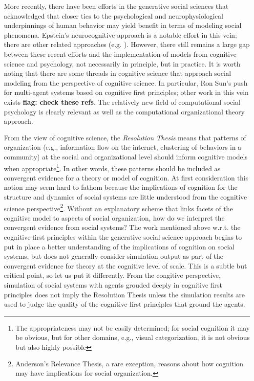 \documentclass{article}
\begin{document}
More recently, there have been efforts in the generative social sciences that acknowledged that closer ties to the psychological and neurophysiological underpinnings of human behavior may yield benefit in terms of modeling social phenomena.  Epstein's neurocognitive approach is a notable effort in this vein\cite{epstein2014}; there are other related approaches (e.g. \cite{caillou2017,sakellariou2008,malleson2012}).  However, there still remains a large gap between these recent efforts and the implementation of models from cognitive science and psychology, not necessarily in principle, but in practice. It is worth noting that there are some threads in cognitive science that approach social modeling from the perspective of cognitive science.  In particular, Ron Sun's push for multi-agent systems based on cognitive first principles\cite{sun2006}; other work in this vein exists\cite{Bhattacharyya2010,lebiere2000,lebiere2003,reitter2010,reitter2012,romero2014,gonzalez2003,fu2007,huberman1998,west2001,west2005} \textbf{flag: check these refs}.  The relatively new field of computational social psychology is clearly relevant\cite{vallacher2017} as well as the computational organizational theory approach\cite{prietula1998}.

From the view of cognitive science, the \textit{Resolution Thesis} means that patterns of organization (e.g., information flow on the internet, clustering of behaviors in a community) at the social and organizational level should inform cognitive models when appropriate\footnote{The appropriateness may not be easily determined; for social cognition it may be obvious, but for other domains, e.g., visual categorization, it is not obvious but also highly possible}.  In other words, these patterns should be included as convergent evidence for a theory or model of cognition.  At first consideration this notion may seem hard to fathom because the implications of cognition for the structure and dynamics of social systems are little understood from the cognitive science perspective\footnote{Anderson's Relevance Thesis\cite{anderson2002}, a rare exception, reasons about how cognition may have implications for social organization.}.  Without an explanatory scheme that links facets of the cognitive model to aspects of social organization, how do we interpret the convergent evidence from social systems?  The work mentioned above w.r.t. the cognitive first principles within the generative social science approach \cite{sun2006,Bhattacharyya2010,lebiere2000,lebiere2003,reitter2010,reitter2012,romero2014,gonzalez2003,fu2007,huberman1998,west2001,west2005} begins to put in  place a better understanding of the implications of cognition on social systems, but does not generally consider simulation output as part of the convergent evidence for theory at the cognitive level of scale.  This is a subtle but critical point, so let us put it differently.  From the congitive perspective, simulation of social systems with agents grouded deeply in cognitive first principles does not imply the Resolution Thesis unless the simulation results are used to judge the quality of the cognitive first principles that ground the agents.  
\end{document}
